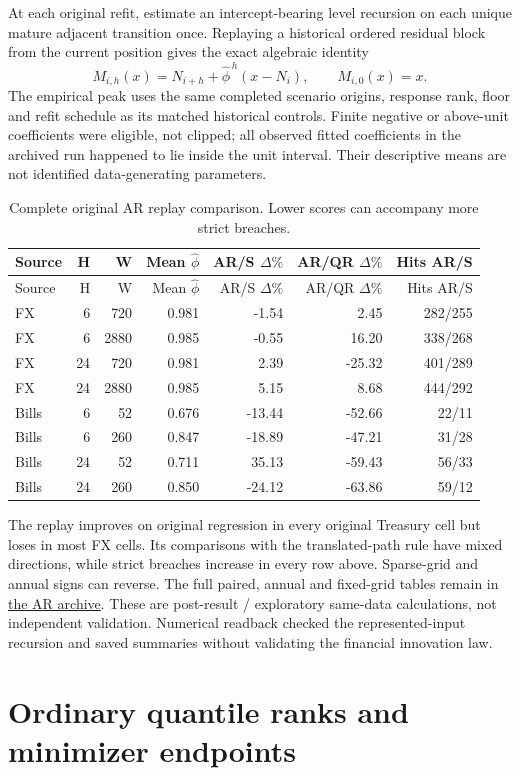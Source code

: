 \documentclass[11pt,a4paper]{article}
\begin{document}
At each original refit, estimate an intercept-bearing level recursion
on each unique mature adjacent transition once. Replaying a historical ordered
residual block from the current position gives the exact algebraic identity
\[
M_{i,h}(x)=N_{i+h}+\widehat\phi^{\,h}(x-N_i),\qquad M_{i,0}(x)=x.
\]
The empirical peak uses the same completed scenario origins, response rank,
floor and refit schedule as its matched historical controls. Finite negative or
above-unit coefficients were eligible, not clipped; all observed fitted
coefficients in the archived run happened to lie inside the unit interval.
Their descriptive means are not identified data-generating parameters.
\begingroup
\small
\setlength{\tabcolsep}{3pt}
\renewcommand{\arraystretch}{1.12}
\begin{longtable}{lrrrrrr}
\caption{Complete original AR replay comparison. Lower scores can accompany more strict breaches.}\\
\toprule
Source & H & W & Mean \(\widehat\phi\) & AR/S \(\Delta\%\) & AR/QR \(\Delta\%\) & Hits AR/S \\
\midrule
\endfirsthead
\toprule
Source & H & W & Mean \(\widehat\phi\) & AR/S \(\Delta\%\) & AR/QR \(\Delta\%\) & Hits AR/S \\
\midrule
\endhead
\bottomrule
\endfoot
FX & 6 & 720 & 0.981 & -1.54 & 2.45 & 282/255 \\
FX & 6 & 2880 & 0.985 & -0.55 & 16.20 & 338/268 \\
FX & 24 & 720 & 0.981 & 2.39 & -25.32 & 401/289 \\
FX & 24 & 2880 & 0.985 & 5.15 & 8.68 & 444/292 \\
Bills & 6 & 52 & 0.676 & -13.44 & -52.66 & 22/11 \\
Bills & 6 & 260 & 0.847 & -18.89 & -47.21 & 31/28 \\
Bills & 24 & 52 & 0.711 & 35.13 & -59.43 & 56/33 \\
Bills & 24 & 260 & 0.850 & -24.12 & -63.86 & 59/12 \\
\end{longtable}
\endgroup

The replay improves on original regression in every original Treasury
cell but loses in most FX cells. Its comparisons with the translated-path rule
have mixed directions, while strict breaches increase in every row above.
Sparse-grid and annual signs can reverse. The full paired, annual and fixed-grid
tables remain in \href{https://github.com/ByronLi0207/financial-mathematics-paper-20261020/blob/revision-v7-final/results/revision-20261022/ar1-replay/README.md}{the AR archive}.
These are post-result / exploratory same-data calculations, not independent
validation. Numerical readback checked the represented-input recursion and
saved summaries without validating the financial innovation law.\section{Ordinary quantile ranks and minimizer endpoints}\label{sup:rank}
\end{document}
